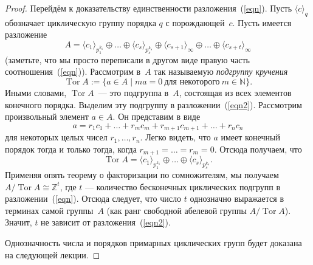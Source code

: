 \documentclass[a4paper,10pt]{amsart}
\DeclareMathOperator{\Tor}{\mathrm{Tor}}
\def\ZZ{{\mathbb Z}}%
\def\NN{{\mathbb N}}%
\theoremstyle{definition}
\theoremstyle{remark}
\begin{document}
\begin{proof}
Перейдём к доказательству единственности разложения~(\ref{eqn}).
Пусть $\langle c \rangle_q$ обозначает циклическую группу порядка
$q$ с порождающей~$c$. Пусть имеется разложение
\begin{equation} \label{eqn2}
A = \langle c_1\rangle_{p_1^{k_1}} \oplus \ldots \oplus \langle c_s
\rangle_{p_s^{k_s}} \oplus \langle c_{s+1} \rangle_{\infty} \oplus
\ldots \oplus \langle c_{s+t} \rangle_{\infty}
\end{equation}
(заметьте, что мы просто переписали в другом виде правую часть
соотношения~(\ref{eqn})). Рассмотрим в~$A$ так называемую {\it
подгруппу кручения}
$$
\Tor A := \{ a \in A \mid ma=0 \ \text{для некоторого} \ m \in \NN
\}.
$$
Иными словами, $\Tor A$~--- это подгруппа в~$A$, состоящая из всех
элементов конечного порядка. Выделим эту подгруппу в
разложении~(\ref{eqn2}). Рассмотрим произвольный элемент $a \in A$.
Он представим в виде
$$
a = r_1c_1 + \ldots + r_m c_m + r_{m+1} c_{m+1} + \ldots + r_n c_n
$$
для некоторых целых чисел $r_1, \ldots, r_n$. Легко видеть, что $a$
имеет конечный порядок тогда и только тогда, когда $r_{m+1} = \ldots
= r_m = 0$. Отсюда получаем, что
\begin{equation} \label{eqn3}
\Tor A = \langle c_1 \rangle_{p_1^{k_1}} \oplus \ldots \oplus
\langle c_s \rangle_{p_s^{k_s}}.
\end{equation}
Применяя опять теорему о факторизации по сомножителям, мы получаем
$A / \Tor A \cong \ZZ^t$, где $t$ --- количество бесконечных 
циклических подгрупп в разложении~(\ref{eqn}). Отсюда следует, 
что число $t$ однозначно выражается в терминах самой группы~$A$ 
(как ранг свободной абелевой группы $A / \Tor A$). Значит, $t$ 
не зависит от разложения~(\ref{eqn2}).

Однозначность числа и порядков примарных циклических
групп будет доказана на следующей лекции.

\end{proof}
\end{document}

